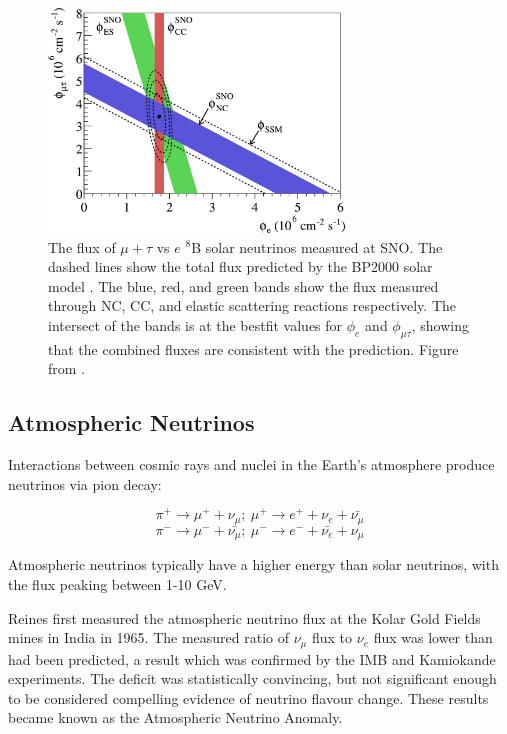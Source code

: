 \begin{figure}
\centering
\includegraphics*[width=0.7\textwidth,clip]{figs/snoresult}
\caption{The flux of $\mu+\tau$ vs $e$ $^8$B solar neutrinos measured at SNO. The dashed lines show the total flux predicted by the BP2000 solar model \cite{solmod}. The blue, red, and green bands show the flux measured through NC, CC, and elastic scattering reactions respectively. The intersect of the bands is at the bestfit values for $\phi_e$ and $\phi_{\mu\tau}$, showing that the combined fluxes are consistent with the prediction. Figure from \cite{snoresult}.} \label{fig:snores}
\end{figure}

\subsection{Atmospheric Neutrinos}\label{sec:atmosphericneutrinos}

Interactions between cosmic rays and nuclei in the Earth's atmosphere produce neutrinos via pion decay:

\begin{equation}
\pi^{+} \rightarrow \mu^{+} + \nu_{\mu}; \medspace \mu^+ \rightarrow e^{+} + \nu_{e} + \bar{\nu_{\mu}}
\end{equation}
\begin{equation}
\pi^- \rightarrow \mu^{-} + \bar{\nu_{\mu}}; \medspace \mu^{-} \rightarrow e^{-} + \bar{\nu_{e}} + \nu_{\mu}
\end{equation}

Atmospheric neutrinos typically have a higher energy than solar neutrinos, with the flux peaking between 1-10 GeV.

Reines \cite{reines} first measured the atmospheric neutrino flux at the Kolar Gold Fields mines in India in 1965. The measured ratio of $\nu_{\mu}$ flux to $\nu_e$ flux was lower than had been predicted, a result which was confirmed by the IMB \cite{imb} and Kamiokande \cite{kamiokande2} experiments. The deficit was statistically convincing, but not significant enough to be considered compelling evidence of neutrino flavour change. These results became known as the Atmospheric Neutrino Anomaly. 

